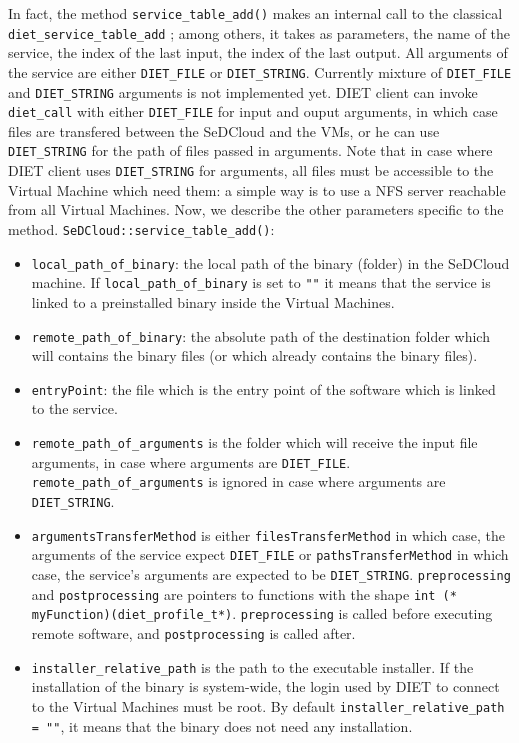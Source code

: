 In fact, the method \texttt{service\_table\_add()} makes an internal
call to the classical\\ \texttt{diet\_service\_table\_add} ; among
others, it takes as parameters, the name of the service, the index of
the last input, the index of the last output. All arguments of the
service are either \texttt{DIET\_FILE} or
\texttt{DIET\_STRING}. Currently mixture of \texttt{DIET\_FILE} and
\texttt{DIET\_STRING} arguments is not implemented yet. DIET client
can invoke \texttt{diet\_call} with either \texttt{DIET\_FILE} for
input and ouput arguments, in which case files are transfered between
the SeDCloud and the VMs, or he can use \texttt{DIET\_STRING} for the
path of files passed in arguments. Note that in case where DIET client
uses \texttt{DIET\_STRING} for arguments, all files must be accessible
to the Virtual Machine which need them: a simple way is to use a NFS
server reachable from all Virtual Machines. Now, we describe the other
parameters specific to the method.
\texttt{SeDCloud::service\_table\_add()}:
 \begin{itemize}
   \item \texttt{local\_path\_of\_binary}: the local path of the
     binary (folder) in the SeDCloud machine. If
     \texttt{local\_path\_of\_binary} is set to \texttt{""} it means
     that the service is linked to a preinstalled binary inside the
     Virtual Machines.
   \item \texttt{remote\_path\_of\_binary}: the absolute path of the
     destination folder which will contains the binary files (or which
     already contains the binary files).
   \item \texttt{entryPoint}: the file which is the entry point of the
     software which is linked to the service.
   \item \texttt{remote\_path\_of\_arguments} is the folder which will
     receive the input file arguments, in case where arguments are
     \texttt{DIET\_FILE}.  \texttt{remote\_path\_of\_arguments} is
     ignored in case where arguments are \texttt{DIET\_STRING}.
   \item \texttt{argumentsTransferMethod} is either
     \texttt{filesTransferMethod} in which case, the arguments of the
     service expect \texttt{DIET\_FILE} or
     \texttt{pathsTransferMethod} in which case, the service's
     arguments are expected to be \texttt{DIET\_STRING}.
     \texttt{preprocessing} and \texttt{postprocessing} are pointers
     to functions with the shape \texttt{int (*
       myFunction)(diet\_profile\_t*)}. \texttt{preprocessing} is
     called before executing remote software, and
     \texttt{postprocessing} is called after.
   \item \texttt{installer\_relative\_path} is the path to the
     executable installer. If the installation of the binary is
     system-wide, the login used by DIET to connect to the Virtual
     Machines must be root. By default
     \texttt{installer\_relative\_path = ""}, it means that the binary
     does not need any installation.
 \end{itemize}


